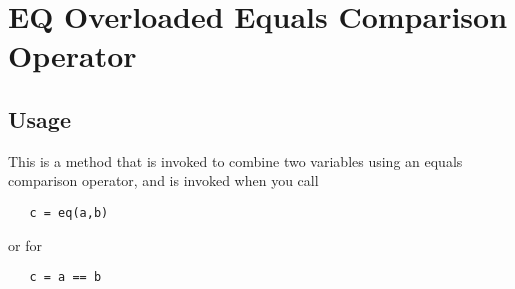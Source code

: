 \section{EQ Overloaded Equals Comparison Operator}

\subsection{Usage}

This is a method that is invoked to combine two variables using an
equals comparison operator, and is invoked when you call
\begin{verbatim}
   c = eq(a,b)
\end{verbatim}
or for 
\begin{verbatim}
   c = a == b
\end{verbatim}
